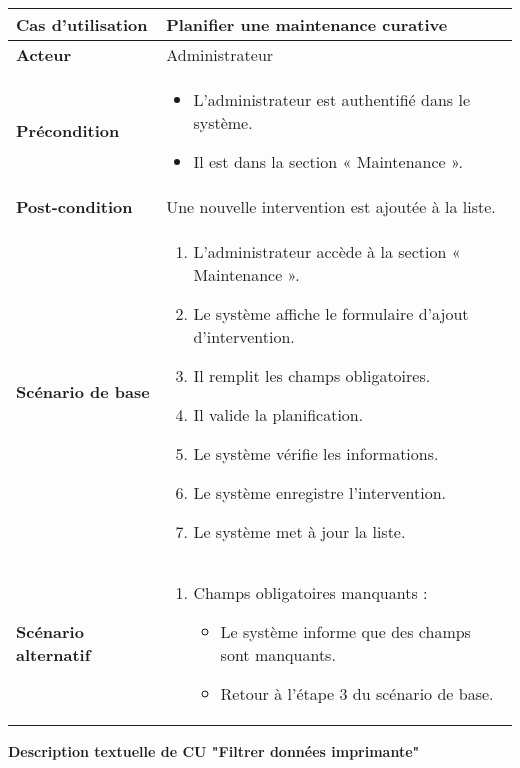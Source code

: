 \documentclass[a4paper,11pt]{report}
\begin{document}
\begin{tabularx}{\textwidth}{|>{\bfseries}l|X|}
\hline
Cas d’utilisation    & Planifier une maintenance curative \\
\hline
Acteur               & Administrateur \\
\hline
Précondition         &
\begin{itemize}[left=0pt]
  \item L’administrateur est authentifié dans le système.
  \item Il est dans la section « Maintenance ».
\end{itemize} \\
\hline
Post-condition       & Une nouvelle intervention est ajoutée à la liste. \\
\hline
Scénario de base     &
\begin{enumerate}[left=0pt]
  \item L’administrateur accède à la section « Maintenance ».
  \item Le système affiche le formulaire d’ajout d’intervention.
  \item Il remplit les champs obligatoires.
  \item Il valide la planification.
  \item Le système vérifie les informations.
  \item Le système enregistre l’intervention.
  \item Le système met à jour la liste.
\end{enumerate} \\
\hline
Scénario alternatif   &
\begin{enumerate}[label=\arabic*.a,wide=0pt]
  \item Champs obligatoires manquants :
    \begin{itemize}[left=1em]
      \item Le système informe que des champs sont manquants.
      \item Retour à l’étape 3 du scénario de base.
    \end{itemize}
\end{enumerate} \\
\hline
\end{tabularx}


\textbf{Description textuelle de CU "Filtrer données imprimante"}
\end{document}
